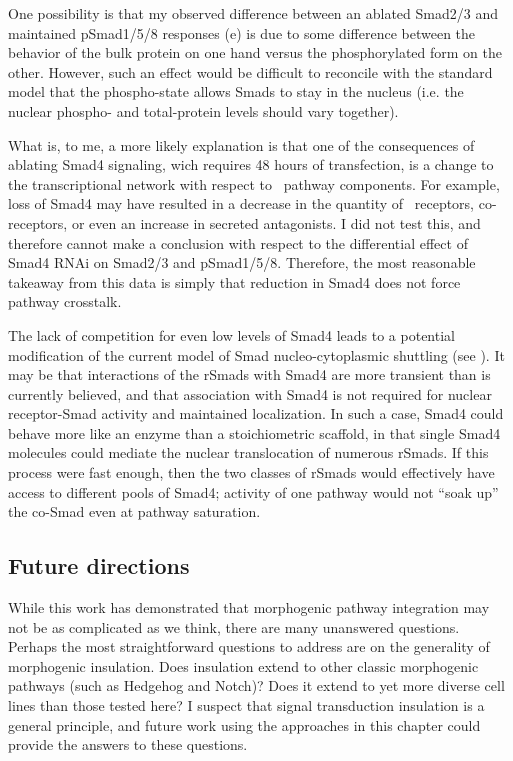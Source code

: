 One possibility is that my observed difference between an
ablated Smad2/3 and maintained pSmad1/5/8 responses
(e) is due
to some difference between the behavior of the bulk protein on one hand
versus the phosphorylated form on the other. However, such an effect would
be difficult to reconcile with the standard model that
the phospho-state allows Smads to stay in the nucleus
(i.e. the nuclear phospho- and total-protein levels should vary together).


What is, to me, a more likely explanation is that one of the
consequences of ablating Smad4 signaling, wich requires 48 hours
of transfection, is a change to the transcriptional network
with respect to \tgfbsf\ pathway components. For example, loss
of Smad4 may have resulted in a decrease in the quantity of \tgf\
receptors, co-receptors, or even an increase in secreted
antagonists. I did not test this, and therefore cannot make
a conclusion with respect to the differential effect of Smad4 RNAi
on Smad2/3 and pSmad1/5/8. Therefore, the most reasonable takeaway from this
data is simply that reduction in Smad4 does not force pathway
crosstalk.


The lack of competition for even low levels of Smad4 leads
to a potential modification of the current model of Smad
nucleo-cytoplasmic shuttling (see ).
It may be that interactions of the
rSmads with Smad4 are more transient than is currently
believed, and that association with Smad4 is not required
for nuclear receptor-Smad activity and maintained localization.
In such a case, Smad4 could behave more like an enzyme
than a stoichiometric scaffold, in that single Smad4 molecules
could mediate the nuclear translocation of numerous rSmads.
If this process were fast enough, then the two classes of rSmads
would effectively have access to different pools of Smad4;
activity of one pathway would not ``soak up'' the co-Smad even
at pathway saturation.


\subsection{Future directions}


While this work has demonstrated that morphogenic
pathway integration may not be as complicated as we think,
there are many unanswered questions. Perhaps the most straightforward
questions to address are on the generality of morphogenic
insulation. Does insulation extend to other classic morphogenic pathways
(such as Hedgehog and Notch)? Does it extend to yet more
diverse cell lines than those tested here? I suspect that
signal transduction insulation is a general principle, and future
work using the approaches
in this chapter could provide the answers to these questions. 



